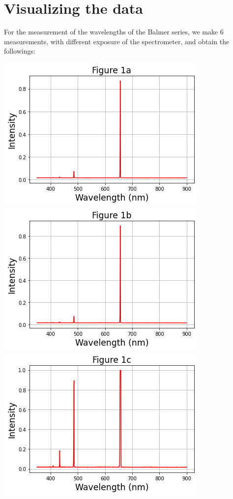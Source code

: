 \documentclass[11pt]{book}
\theoremstyle{break}
\theoremstyle{break}
\begin{document}
\newpage
\section{Visualizing the data}
For the measurement of the wavelengths of the Balmer series, we make 6 measurements, with different exposure of the spectrometer, and obtain the followings:
\begin{center}
\includegraphics[scale=0.55]{1a}
\includegraphics[scale=0.55]{1b}
\includegraphics[scale=0.55]{1c}

\end{center}
\end{document}
